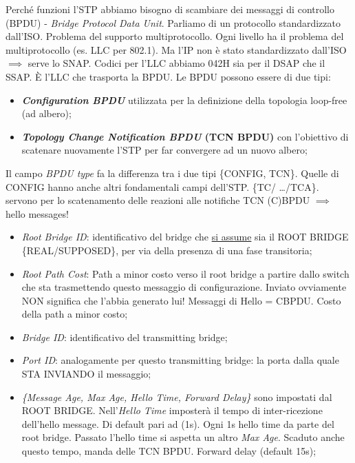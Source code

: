Perché funzioni l'STP abbiamo bisogno di scambiare dei messaggi di controllo (BPDU) - \textit{Bridge Protocol Data Unit}. Parliamo di un protocollo standardizzato dall'ISO. Problema del supporto multiprotocollo. Ogni livello ha il problema del multiprotocollo (es. LLC per 802.1). Ma l'IP non è stato standardizzato dall'ISO $\implies$ serve lo SNAP. Codici per l'LLC abbiamo 042H sia per il DSAP che il SSAP. \`E l'LLC che trasporta la BPDU. Le BPDU possono essere di due tipi:

\begin{itemize}

\item{\textbf{\textit{Configuration BPDU}}} utilizzata per la definizione della topologia loop-free (ad albero);
\item{\textbf{\textit{Topology Change Notification BPDU} (TCN BPDU)}} con l'obiettivo di scatenare nuovamente l'STP per far convergere ad un nuovo albero;
\end{itemize}

Il campo \textit{BPDU type} fa la differenza tra i due tipi \{CONFIG, TCN\}. Quelle di CONFIG hanno anche altri fondamentali campi dell'STP. \{TC/ \dots /TCA\}. servono per lo scatenamento delle reazioni alle notifiche TCN (C)BPDU $\implies$ hello messages!

\begin{itemize}

\item{\textit{Root Bridge ID}}: identificativo del bridge che \newline \underline{si assume} sia il ROOT BRIDGE \{REAL/SUPPOSED\}, per via della presenza di una fase transitoria;
\item{\textit{Root Path Cost}}: Path a minor costo verso il root bridge a partire dallo switch che sta trasmettendo questo messaggio di configurazione. Inviato ovviamente NON significa che l'abbia generato lui!
Messaggi di Hello = CBPDU. Costo della path a minor costo;

\item{\textit{Bridge ID}}: identificativo del transmitting bridge;
\item{\textit{Port ID}}: analogamente per questo transmitting bridge: la porta dalla quale STA INVIANDO il messaggio;
\item{\textit{\{Message Age, Max Age, Hello Time, Forward Delay\}}} sono impostati dal ROOT BRIDGE. Nell'\textit{Hello Time} imposterà il tempo di inter-ricezione dell'hello message. Di default pari ad (1s). Ogni 1s hello time da parte del root bridge. Passato l'hello time si aspetta un altro \textit{Max Age}. Scaduto anche questo tempo, manda delle TCN BPDU. Forward delay (default 15s);

\end{itemize}

